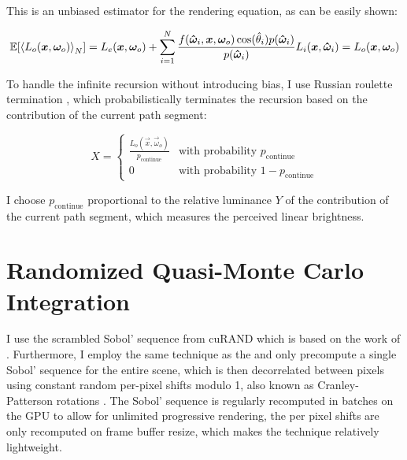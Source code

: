 This is an unbiased estimator for the rendering equation, as can be easily shown:

\begin{equation}
    \expectation{\estimator{L_o(\vec{x}, \vec{\omega}_o)}} = L_e(\vec{x}, \vec{\omega}_o) + \sum_{i=1}^{N} \frac{f(\vec{\hat{\omega}}_i, \vec{x}, \vec{\omega}_o) \cos(\hat{\theta}_i) p(\vec{\hat{\omega}}_i)}{p(\vec{\hat{\omega}}_i)} L_i(\vec{x}, \vec{\hat{\omega}}_i) = L_o(\vec{x}, \vec{\omega}_o)
\end{equation}

To handle the infinite recursion without introducing bias, I use Russian roulette termination , which probabilistically terminates the recursion based on the contribution of the current path segment:

\begin{equation}
    X =
    \begin{cases}
        \frac{L_o(\vec{x}, \vec{\omega}_o)}{p_\mathrm{continue}} & \text{with probability } p_\mathrm{continue} \\
        0 & \text{with probability } 1 - p_\mathrm{continue}
    \end{cases}
\end{equation}

I choose $p_\mathrm{continue}$ proportional to the relative luminance $Y$ of the contribution of the current path segment, which measures the perceived linear brightness.



\section{Randomized Quasi-Monte Carlo Integration}

I use the scrambled Sobol' sequence from cuRAND  which is based on the work of \textcite{owen2008}.
Furthermore, I employ the same technique as the \textcite{blenderfoundation} and only precompute a single Sobol' sequence for the entire scene, which is then decorrelated between pixels using constant random per-pixel shifts modulo 1, also known as Cranley-Patterson rotations .
The Sobol' sequence is regularly recomputed in batches on the GPU to allow for unlimited progressive rendering, the per pixel  shifts are only recomputed on frame buffer resize, which makes the technique relatively lightweight.

